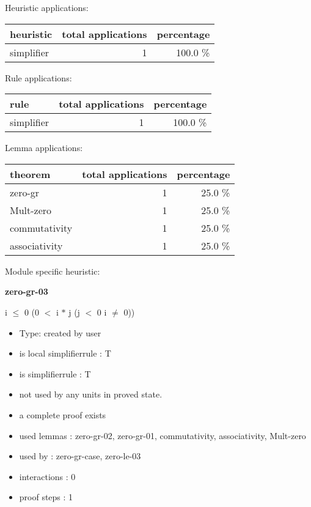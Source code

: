 \documentclass[a4paper]{article}
\begin{document}
\medskip


Heuristic applications:

\begin{supertabular}{l|r|r}
heuristic	& total applications & percentage \\ \hline
simplifier & 1 & 100.0 \% \\

\end{supertabular}

Rule applications:

\begin{supertabular}{l|r|r}
rule	        & total applications & percentage \\ \hline
simplifier & 1 & 100.0 \% \\

\end{supertabular}

Lemma applications:

\begin{supertabular}{l|r|r}
theorem	        & total applications & percentage \\ \hline
zero-gr & 1 & 25.0 \% \\
Mult-zero & 1 & 25.0 \% \\
commutativity & 1 & 25.0 \% \\
associativity & 1 & 25.0 \% \\

\end{supertabular}

Module specific heuristic:

\pagebreak

{\LARGE\bf zero-gr-03}\label{lemma-zero-gr-03}

\medskip

 \Fol i $\le$ 0 \Imp (0 $<$ i $*$ j \Equiv \Not \Not (j $<$ 0 \And i $\neq$ 0))

\begin{itemize}

\item Type: created by user

\item is local simplifierrule : T
\item is simplifierrule : T
\item not used by any units in proved state.
\item       a complete proof exists
\item       used lemmas  : zero-gr-02, zero-gr-01, commutativity, associativity, Mult-zero
\item       used by      : zero-gr-case, zero-le-03
\item       interactions : 0
\item       proof steps  : 1
\end{itemize}
\end{document}
